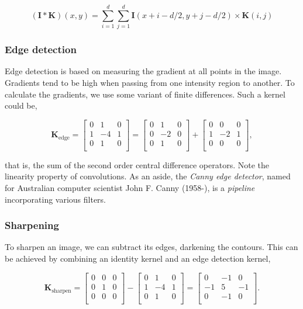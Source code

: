 \documentclass[11pt]{amsart}
\begin{document}
$$(\mathbf{I} * \mathbf{K})(x, y) = \sum_{i = 1}^{d}\sum_{j = 1}^{d} \mathbf{I}(x + i -d/2, y + j - d/2) \times \mathbf{K}(i, j)$$

\subsubsection{Edge detection}

Edge detection is based on measuring the gradient at all points in the image. Gradients tend to be high when passing from one intensity region to another. To calculate the gradients, we use some variant of finite differences. Such a kernel could be,

$$
\mathbf{K}_{\text{edge}} =
\begin{bmatrix}
0 & 1 & 0 \\
1 & -4 & 1 \\
0 & 1 & 0 \\
\end{bmatrix}
= \begin{bmatrix}
0 & 1 & 0 \\
0 & -2 & 0 \\
0 & 1 & 0 \\
\end{bmatrix} + \begin{bmatrix}
0 & 0 & 0 \\
1 & -2 & 1 \\
0 & 0 & 0 \\
\end{bmatrix},
$$

that is, the sum of the second order central difference operators. Note the linearity property of convolutions. As an aside, the \emph{Canny edge detector}, named for Australian computer scientist John F. Canny (1958-), is a \emph{pipeline} incorporating various filters.

\subsubsection{Sharpening}

To sharpen an image, we can subtract its edges, darkening the contours. This can be achieved by combining an identity kernel and an edge detection kernel,

$$
\mathbf{K}_{\text{sharpen}} =
\begin{bmatrix}
0 & 0 & 0 \\
0 & 1 & 0 \\
0 & 0 & 0 \\
\end{bmatrix} - \begin{bmatrix}
0 & 1 & 0 \\
1 & -4 & 1 \\
0 & 1 & 0 \\
\end{bmatrix} =
\begin{bmatrix}
0 & -1 & 0 \\
-1 & 5 & -1 \\
0 & -1 & 0 \\
\end{bmatrix}.
$$
\end{document}
